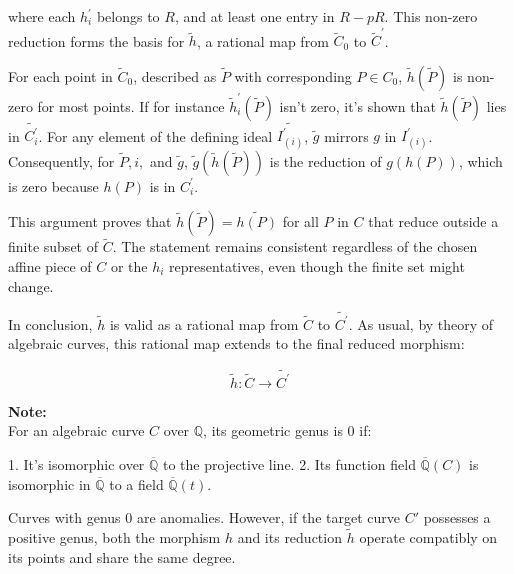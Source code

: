where each \( h_{i}^{\prime} \) belongs to \( R \), and at least one entry in \( R-pR \). This non-zero reduction forms the basis for \( \tilde{h} \), a rational map from \( \widetilde{C}_{0} \) to \( \widetilde{C}^{\prime} \).

For each point in \( \widetilde{C}_{0} \), described as \( \widetilde{P} \) with corresponding \( P \in C_{0} \), \( \tilde{h}(\widetilde{P}) \) is non-zero for most points. If for instance \( \tilde{h}_{i}^{\prime}(\widetilde{P}) \) isn't zero, it's shown that \( \tilde{h}(\widetilde{P}) \) lies in \( \widetilde{C_{i}^{\prime}} \). For any element of the defining ideal \( \widetilde{I_{(i)}^{\prime}} \), \( \tilde{g} \) mirrors \( g \) in \( I_{(i)}^{\prime} \). Consequently, for \( \widetilde{P}, i, \) and \( \tilde{g} \), \( \tilde{g}(\tilde{h}(\widetilde{P})) \) is the reduction of \( g(h(P)) \), which is zero because \( h(P) \) is in \( C_{i}^{\prime} \).

This argument proves that \( \tilde{h}(\widetilde{P}) = \widetilde{h(P)} \) for all \( P \) in \( C \) that reduce outside a finite subset of \( \widetilde{C} \). The statement remains consistent regardless of the chosen affine piece of \( C \) or the \( h_{i} \) representatives, even though the finite set might change.

In conclusion, \( \tilde{h} \) is valid as a rational map from \( \widetilde{C} \) to \( \widetilde{C^{\prime}} \). As usual, by theory of algebraic curves, this rational map extends to the final reduced morphism:

\[
\tilde{h}: \widetilde{C} \longrightarrow \widetilde{C^{\prime}}
\]

\textbf{Note:}\\
For an algebraic curve \( C \) over \( \mathbb{Q} \), its geometric genus is 0 if:

1. It's isomorphic over \( \overline{\mathbb{Q}} \) to the projective line.
2. Its function field \( \overline{\mathbb{Q}}(C) \) is isomorphic in \( \overline{\mathbb{Q}} \) to a field \( \overline{\mathbb{Q}}(t) \).

Curves with genus 0 are anomalies. However, if the target curve \( C' \) possesses a positive genus, both the morphism \( h \) and its reduction \( \tilde{h} \) operate compatibly on its points and share the same degree.

